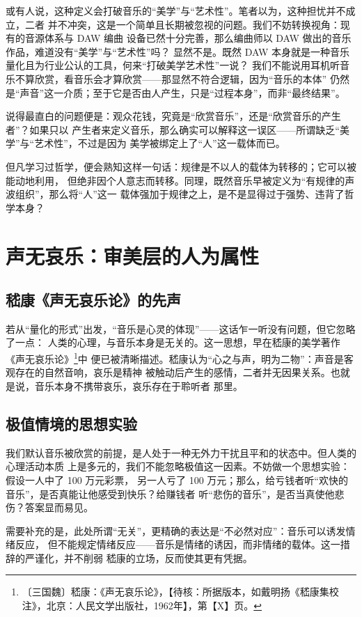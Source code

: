\documentclass[11pt,a4paper,fontset=none]{ctexart}
\begin{document}
或有人说，这种定义会打破音乐的“美学”与“艺术性”。笔者以为，这种担忧并不成立，二者
并不冲突，这是一个简单且长期被忽视的问题。我们不妨转换视角：现有的音源体系与 DAW 编曲
设备已然十分完善，那么编曲师以 DAW 做出的音乐作品，难道没有“美学”与“艺术性”吗？
显然不是。既然 DAW 本身就是一种音乐量化且为行业公认的工具，何来“打破美学艺术性”一说？
我们不能说用耳机听音乐不算欣赏，看音乐会才算欣赏——那显然不符合逻辑，因为“音乐的本体”
仍然是“声音”这一介质；至于它是否由人产生，只是“过程本身”，而非“最终结果”。

说得最直白的问题便是：观众花钱，究竟是“欣赏音乐”，还是“欣赏音乐的产生者”？如果只以
产生者来定义音乐，那么确实可以解释这一误区——所谓缺乏“美学”与“艺术性”，不过是因为
美学被绑定上了“人”这一载体而已。

但凡学习过哲学，便会熟知这样一句话：规律是不以人的载体为转移的；它可以被能动地利用，
但绝非因个人意志而转移。同理，既然音乐早被定义为“有规律的声波组织”，那么将“人”这一
载体强加于规律之上，是不是显得过于强势、违背了哲学本身？

\section{声无哀乐：审美层的人为属性}

\subsection{嵇康《声无哀乐论》的先声}

若从“量化的形式”出发，“音乐是心灵的体现”——这话乍一听没有问题，但它忽略了一点：
人类的心理，与音乐本身是无关的。这一思想，早在嵇康的美学著作《声无哀乐论》\footnote{〔三国魏〕嵇康：《声无哀乐论》，【待核：所据版本，如戴明扬《嵇康集校注》，北京：人民文学出版社，1962年】，第【X】页。}中
便已被清晰描述。嵇康认为“心之与声，明为二物”：声音是客观存在的自然音响，哀乐是精神
被触动后产生的感情，二者并无因果关系。也就是说，音乐本身不携带哀乐，哀乐存在于聆听者
那里。

\subsection{极值情境的思想实验}

我们默认音乐被欣赏的前提，是人处于一种无外力干扰且平和的状态中。但人类的心理活动本质
上是多元的，我们不能忽略极值这一因素。不妨做一个思想实验：假设一人中了 100 万元彩票，
另一人亏了 100 万元；那么，给亏钱者听“欢快的音乐”，是否真能让他感受到快乐？给赚钱者
听“悲伤的音乐”，是否当真使他悲伤？答案显而易见。

需要补充的是，此处所谓“无关”，更精确的表达是“不必然对应”：音乐可以诱发情绪反应，
但不能规定情绪反应——音乐是情绪的诱因，而非情绪的载体。这一措辞的严谨化，并不削弱
嵇康的立场，反而使其更有凭据。
\end{document}
